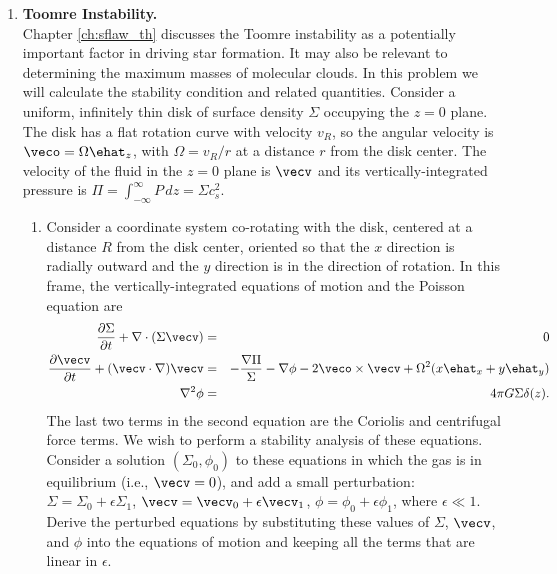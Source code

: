 \documentclass[twoside]{tufte-book} %
\begin{document}
\begin{enumerate}



\item \textbf{Toomre Instability.}\\
Chapter \ref{ch:sflaw_th} discusses the Toomre instability as a potentially important factor in driving star formation. It may also be relevant to determining the maximum masses of molecular clouds. In this problem we will calculate the stability condition and related quantities. Consider a uniform, infinitely thin disk of surface density $\Sigma$ occupying the $z=0$ plane. The disk has a flat rotation curve with velocity $v_R$, so the angular velocity is $\veco=\Omega \ehat_z$, with $\Omega = v_R/r$ at a distance $r$ from the disk center. The velocity of the fluid in the $z=0$ plane is $\vecv$ and its vertically-integrated pressure is $\Pi=\int_{-\infty}^{\infty} P \, dz = \Sigma c_s^2$. 
\begin{enumerate}
\item Consider a coordinate system co-rotating with the disk, centered at a distance $R$ from the disk center, oriented so that the $x$ direction is radially outward and the $y$ direction is in the direction of rotation. In this frame, the vertically-integrated equations of motion and the Poisson equation are
\begin{eqnarray*}
\frac{\partial \Sigma}{\partial t} + \nabla \cdot (\Sigma \vecv) & = & 0 \\
\frac{\partial \vecv}{\partial t} + (\vecv\cdot\nabla)\vecv & = & -\frac{\nabla \Pi}{\Sigma} - \nabla \phi - 2\veco \times \vecv + \Omega^2 (x \ehat_x + y \ehat_y) \\
\nabla^2 \phi & = & 4 \pi G \Sigma \delta(z).
\end{eqnarray*}
The last two terms in the second equation are the Coriolis and centrifugal force terms.
We wish to perform a stability analysis of these equations. Consider a solution $(\Sigma_0, \phi_0)$ to these equations in which the gas is in equilibrium (i.e., $\vecv=0$), and add a small perturbation: $\Sigma=\Sigma_0 + \epsilon \Sigma_1$, $\vecv = \vecv_0 + \epsilon \vecv_1$, $\phi=\phi_0 + \epsilon \phi_1$, where $\epsilon \ll 1$. Derive the perturbed equations by substituting these values of $\Sigma$, $\vecv$, and $\phi$ into the equations of motion and keeping all the terms that are linear in $\epsilon$.

\end{enumerate}
\end{enumerate}
\end{document}
